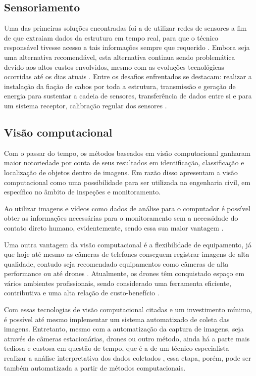 \subsection{Sensoriamento}

Uma das primeiras soluções encontradas foi a de utilizar redes de sensores a fim de que extraiam  dados da estrutura em tempo real, para que o técnico responsável tivesse acesso a tais informações sempre que requerido \cite{spencer2019advances}.
Embora seja uma alternativa recomendável, esta alternativa continua sendo problemática devido aos altos custos envolvidos, mesmo com as evoluções tecnológicas ocorridas até os dias atuais \cite{Zhuang2022}.
Entre os desafios enfrentados se destacam: realizar a instalação da fiação de cabos por toda a estrutura, transmissão e geração de energia para sustentar a cadeia de sensores, transferência de dados entre si e para um sistema receptor, calibração regular dos sensores \cite{catbas2018vision}.

\subsection{Visão computacional}

Com o passar do tempo, os métodos baseados em visão computacional ganharam maior notoriedade por conta de seus resultados em identificação, classificação e localização de objetos dentro de imagens.
Em razão disso  apresentam a visão computacional como uma possibilidade para ser utilizada na engenharia civil, em específico no âmbito de inspeções e monitoramento.

Ao utilizar imagens e vídeos como dados de análise para o computador é possível obter as informações necessárias para o monitoramento \cite{spencer2019advances} sem a necessidade do contato direto humano, evidentemente, sendo essa sua maior vantagem \cite{catbas2018vision}.

Uma outra vantagem da visão computacional é a flexibilidade de equipamento, já que hoje até mesmo as câmeras de telefones conseguem registrar imagens de alta qualidade, contudo seja recomendado equipamentos como câmeras de alta performance ou até drones \cite{dorafshan2018bridge}.
Atualmente, os drones têm conquistado espaço em vários ambientes profissionais, sendo considerado uma ferramenta eficiente, contributiva e uma alta relação de custo-benefício \cite{zoubir2021crack}. 

Com essas tecnologias de visão computacional citadas e um investimento mínimo, é possível até mesmo implementar um sistema automatizado de coleta das imagens. 
Entretanto, mesmo com a automatização da captura de imagens, seja através de câmeras estacionárias, drones ou outro método, ainda há a parte mais tediosa e custosa em questão de tempo, que é a de um técnico especialista realizar a análise interpretativa dos dados coletados \cite{zoubir2021crack}, essa etapa, porém, pode ser também automatizada a partir de métodos computacionais.

